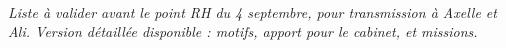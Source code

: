 \documentclass[11pt,a4paper]{article}
\begin{document}
%
%

\vspace{6pt}
\noindent{\color{accent}\rule{\textwidth}{0.6pt}}\\[1pt]
{\footnotesize\itshape Liste à valider avant le point RH du 4 septembre, pour transmission à
Axelle et Ali. Version détaillée disponible : motifs, apport pour le cabinet, et missions.}
\end{document}

